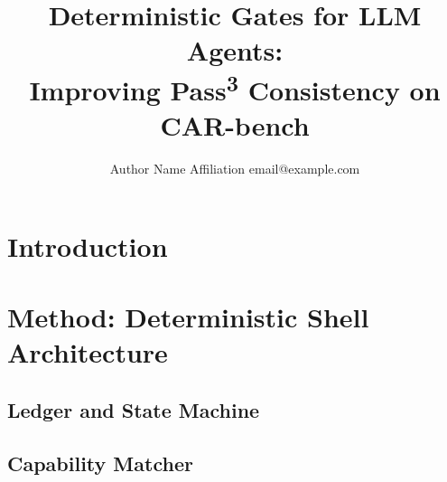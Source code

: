 \documentclass{article}
\title{Deterministic Gates for LLM Agents:\\
       Improving Pass\textsuperscript{3} Consistency on CAR-bench}
\author{
    Author Name
    \affiliations
    Affiliation
    \emails
    email@example.com
}
\begin{document}
\maketitle

\begin{abstract}
\end{abstract}

\section{Introduction}
%
%
%

\section{Method: Deterministic Shell Architecture}

\subsection{Ledger and State Machine}

\subsection{Capability Matcher}
\end{document}
